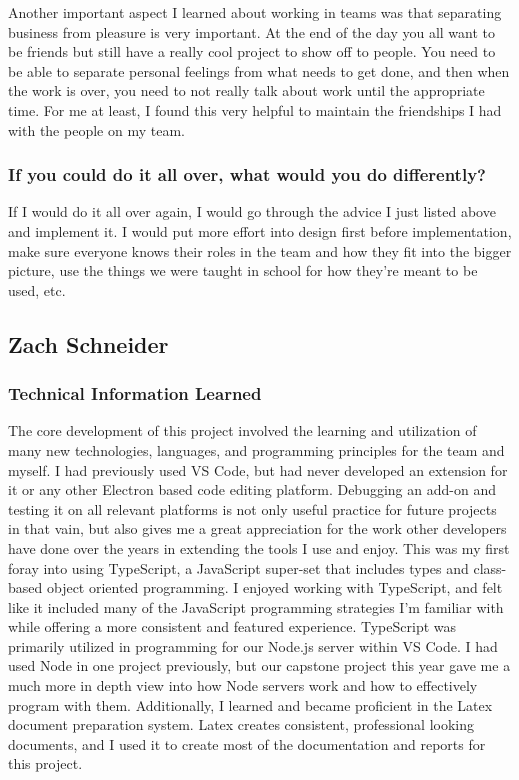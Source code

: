 \documentclass[letterpaper,10pt,titlepage,draftclsnofoot,onecolumn,onesided] {IEEEtran}
\begin{document}
Another important aspect I learned about working in teams was that separating business from pleasure is very important. 
At the end of the day you all want to be friends but still have a really cool project to show off to people.
You need to be able to separate personal feelings from what needs to get done, and then when the work is over, you need to not really talk about work until the appropriate time.
For me at least, I found this very helpful to maintain the friendships I had with the people on my team.\\

\subsubsection{If you could do it all over, what would you do differently?}
If I would do it all over again, I would go through the advice I just listed above and implement it.
I would put more effort into design first before implementation, make sure everyone knows their roles in the team and how they fit into the bigger picture, use the things we were taught in school for how they're meant to be used, etc. 

\subsection{Zach Schneider}
\subsubsection{Technical Information Learned}
The core development of this project involved the learning and utilization of many new technologies, languages, and programming principles for the team and myself.
I had previously used VS Code, but had never developed an extension for it or any other Electron based code editing platform.
Debugging an add-on and testing it on all relevant platforms is not only useful practice for future projects in that vain, but also gives me a great appreciation for the work other developers have done over the years in extending the tools I use and enjoy.
This was my first foray into using TypeScript, a JavaScript super-set that includes types and class-based object oriented programming. I enjoyed working with TypeScript, and felt like it included many of the JavaScript programming strategies I'm familiar with while offering a more consistent and featured experience.
TypeScript was primarily utilized in programming for our Node.js server within VS Code.
I had used Node in one project previously, but our capstone project this year gave me a much more in depth view into how Node servers work and how to effectively program with them.
Additionally, I learned and became proficient in the Latex document preparation system.
Latex creates consistent, professional looking documents, and I used it to create most of the documentation and reports for this project.
\end{document}
